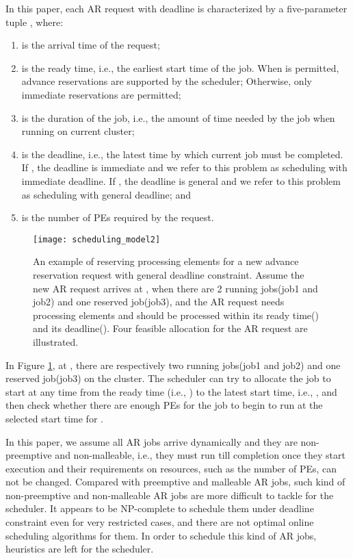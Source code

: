 \documentclass[preprint,12pt]{elsarticle}
\begin{document}
In this paper, each AR request with deadline is characterized by a five-parameter tuple , where:
\begin{enumerate}
    \item  is the arrival time of the request;
    \item  is the ready time, i.e., the earliest start time of the job. When  is permitted, advance reservations are supported by the scheduler; Otherwise, only immediate reservations are permitted;
  \item  is the duration of the job, i.e., the amount of time needed by the job when running on current cluster;
  \item  is the deadline, i.e., the latest time by which current job must be completed. If , the deadline is immediate and we refer to this problem as scheduling with immediate deadline. If , the deadline is general and we refer to this problem as scheduling with general deadline; and
  \item  is the number of PEs required by the request.
\end{enumerate}

\begin{figure}[htp]
\centering
\texttt{[image: scheduling\_model2]}
\caption{An example of reserving processing elements for  a new advance reservation request with general deadline constraint. Assume the new AR request arrives at , when there are 2 running jobs(job1 and job2) and one reserved job(job3), and the AR request needs  processing elements and should be processed within its ready time() and its deadline(). Four feasible allocation for the AR request are illustrated.}
\label{fig:fig1}
\end{figure}


In Figure \ref{fig:fig1}, at , there are respectively two running jobs(job1 and job2) and one reserved job(job3) on the cluster. The scheduler can try to allocate the job to start at any time from the ready time (i.e., ) to the latest start time, i.e., , and then check whether there are enough PEs for the job to begin to run at the selected start time for .


In this paper, we assume all AR jobs arrive dynamically and they are non-preemptive and non-malleable, i.e., they must run till completion once they start execution and their requirements on resources, such as the number of PEs, can not be changed. Compared with preemptive and malleable AR jobs\cite{naiksatam2007elastic}, such kind of non-preemptive and non-malleable AR jobs are more difficult to tackle for the scheduler. It appears to be NP-complete to schedule them under deadline constraint even for very restricted cases, and there are not optimal online scheduling algorithms for them\cite{pinedo2008scheduling}. In order to schedule this kind of AR jobs, heuristics are left for the scheduler.
\end{document}
